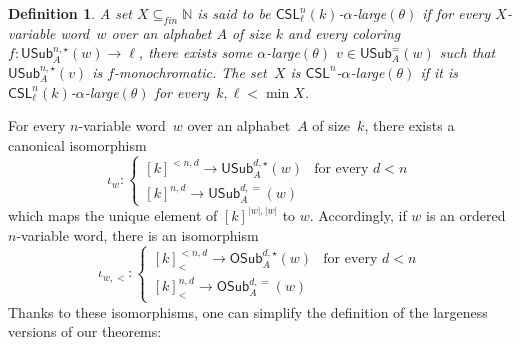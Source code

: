 \documentclass{article}
\numberwithin{theorem}{section}
\newtheorem{lemma}[theorem]{Lemma}
\newtheorem{definition}[theorem]{Definition}
\newcommand{\OVW}{\mathsf{OVW}}
\newcommand{\CSL}{\mathsf{CSL}}
\newcommand{\GR}{\mathsf{GR}}
\newcommand{\NN}{\mathbb{N}}
\newcommand{\OSub}{\mathsf{OSub}}
\newcommand{\USub}{\mathsf{USub}}
\newcommand{\set}{\mathsf{set}}
\begin{document}
\begin{definition}
A set $X \subseteq_{fin} \NN$ is said to be \emph{$\CSL^n_\ell(k)$-$\alpha$-large$(\theta)$} if for every $X$-variable word~$w$ over an alphabet $A$ of size $k$ and every coloring $f : \USub^{n,\star}_A(w) \to \ell$, there exists some $\alpha$-large$(\theta)$ $v \in \USub^{=}_A(w)$ such that $\USub^{n,\star}_A(v)$ is $f$-monochromatic. The set~$X$ is \emph{$\CSL^n$-$\alpha$-large$(\theta)$ if it is $\CSL^n_\ell(k)$-$\alpha$-large$(\theta)$ for every~$k, \ell < \min X$.}
\end{definition}

For every $n$-variable word~$w$ over an alphabet~$A$ of size~$k$, there exists a canonical isomorphism 
$$
\iota_w : \begin{cases} 
    [k]^{<n, d} \to \USub^{d,\star}_A(w) & \text{for every } d < n \\
    [k]^{n, d} \to \USub^{d,=}_A(w) & 
\end{cases}
$$
which maps the unique element of $[k]^{|w|,|w|}$ to $w$. Accordingly, if $w$ is an ordered $n$-variable word, there is an isomorphism 
$$
\iota_{w,<} : \begin{cases} 
    [k]^{<n, d}_{<} \to \OSub^{d,\star}_{A}(w) & \text{for every } d < n \\
    [k]^{n, d}_{<} \to \OSub^{d,=}_{A}(w) & 
\end{cases}
$$
Thanks to these isomorphisms, one can simplify the definition of the largeness versions of our theorems:



\end{document}
